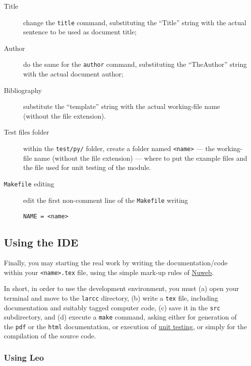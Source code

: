 \documentclass[11pt,oneside]{article}	%
\begin{document}
\begin{description}
\item[Title] change the \texttt{title} command, substituting the ``Title'' string with the actual sentence to be used as document title;

\item[Author]  do the same for the \texttt{author} command, substituting the ``TheAuthor'' string with the actual document author;

\item[Bibliography] substitute the ``template'' string with the actual working-file name (without the file extension).

\item[Test files folder] within the \texttt{test/py/} folder, create a folder named \texttt{<name>} --- the working-file name (without the file extension) --- where to put the example files and the file used for unit testing of the module.

\item[\texttt{Makefile} editing]
edit the first non-comment line of the \texttt{Makefile} writing
{\small
\begin{verbatim}
NAME = <name>
\end{verbatim}}
\end{description}



\subsection{Using the IDE}

Finally, you may starting the real work by writing the documentation/code within your \texttt{<name>.tex} file, using the simple mark-up rules of \href{run:nuwebdoc.pdf}{Nuweb}.

In short, in order to use the development environment, you must (a) open your terminal and move to the \texttt{larcc} directory, (b) write a \texttt{tex} file, including documentation and suitably tagged computer code, (c) save it in the \texttt{src} subdirectory, and (d)  execute a \texttt{make} command, asking either for generation of the \texttt{pdf} or the \texttt{html} documentation, or  execution of \href{http://en.wikipedia.org/wiki/Unit_testing}{unit testing}, or simply for the compilation of the source code.


\subsubsection{Using Leo}
\end{document}
